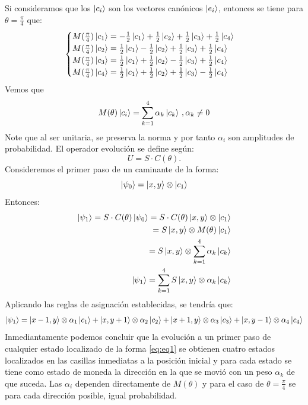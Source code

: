 \documentclass[12pt,a4paper]{article}
\begin{document}
Si consideramos que los $\ket{c_i}$ son los vectores canónicos $\ket{e_i}$, entonces se tiene para $\theta=\frac{\pi}{4}$ que:
\begin{align*}
\begin{cases}
M(\frac{\pi}{4})\ket{c_1}=-\frac{1}{2}\ket{c_1}+\frac{1}{2}\ket{c_2}+\frac{1}{2}\ket{c_3}+\frac{1}{2}\ket{c_4}
\\
M(\frac{\pi}{4})\ket{c_2}=\frac{1}{2}\ket{c_1}-\frac{1}{2}\ket{c_2}+\frac{1}{2}\ket{c_3}+\frac{1}{2}\ket{c_4}
\\
M(\frac{\pi}{4})\ket{c_3}=\frac{1}{2}\ket{c_1}+\frac{1}{2}\ket{c_2}-\frac{1}{2}\ket{c_3}+\frac{1}{2}\ket{c_4}
\\
M(\frac{\pi}{4})\ket{c_4}=\frac{1}{2}\ket{c_1}+\frac{1}{2}\ket{c_2}+\frac{1}{2}\ket{c_3}-\frac{1}{2}\ket{c_4}
\end{cases}
\end{align*}
Vemos que
\begin{equation*}
M(\theta)\ket{c_i}=\sum_{k=1}^{4}\alpha_k \ket{c_k}\, , \alpha_k \neq 0
\end{equation*}
Note que al ser unitaria, se preserva la norma y por tanto $\alpha_i$ son amplitudes de probabilidad.
El operador evolución se define según:
\begin{equation}
U=S\cdot C(\theta).
\end{equation}
Consideremos el primer paso de un caminante de la forma:
\begin{equation}
    \ket{\psi_0}=\ket{x,y}\otimes\ket{c_1}
    \label{eq:firststate}
\end{equation}
Entonces:
\begin{align*}
\ket{\psi_1}= S\cdot C(\theta)\ket{\psi_0}=S\cdot C(\theta)\ket{x,y}\otimes\ket{c_1}
\\
=S\ket{x,y}\otimes M(\theta)\ket{c_1}
\\
=S\ket{x,y}\otimes \sum_{k=1}^{4}\alpha_k \ket{c_k}
\\
\ket{\psi_1}=\sum_{k=1}^{4}S\ket{x,y}\otimes \alpha_k \ket{c_k}
\end{align*}
Aplicando las reglas de asignación establecidas, se tendría que:
\begin{equation}
    \ket{\psi_1}=\ket{x-1,y}\otimes \alpha_1 \ket{c_1}+\ket{x,y+1}\otimes \alpha_2 \ket{c_2}+\ket{x+1,y}\otimes \alpha_3 \ket{c_3}
    +\ket{x,y-1}\otimes \alpha_4 \ket{c_4}
    \label{eq:firststep}
\end{equation}
Inmediantamente podemos concluir que la evolución a un primer paso de cualquier estado localizado de la forma \eqref{eq:eq1} se obtienen cuatro estados localizados en las casillas inmediatas a la posición inicial
y para cada estado se tiene como estado de moneda la dirección en la que se movió con un peso $\alpha_k$ de que suceda.
Las $\alpha_i$ dependen directamente de $M(\theta)$ y para el caso de $\theta=\frac{\pi}{4}$ se para cada dirección posible, igual probabilidad.
\end{document}
